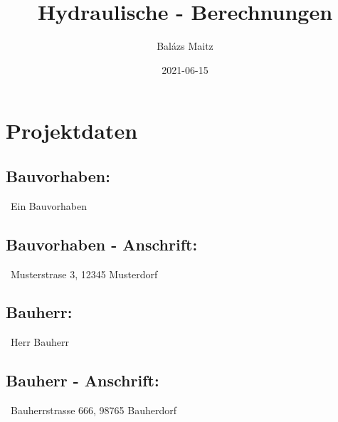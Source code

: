 \documentclass[12pt]{report}
\author{Balázs Maitz} %
\title{Hydraulische - Berechnungen} %
\date{2021-06-15} %
\begin{document}
\maketitle
\tableofcontents


\pagebreak


\chapter*{Projektdaten}

\section*{Bauvorhaben:} \ Ein Bauvorhaben\\
\section*{Bauvorhaben - Anschrift:} \ Musterstrase 3, 12345 Musterdorf\\
\section*{Bauherr:} \ Herr Bauherr\\
\section*{Bauherr - Anschrift:} \ Bauherrstrasse 666, 98765 Bauherdorf\\

\pagebreak


\end{document}
